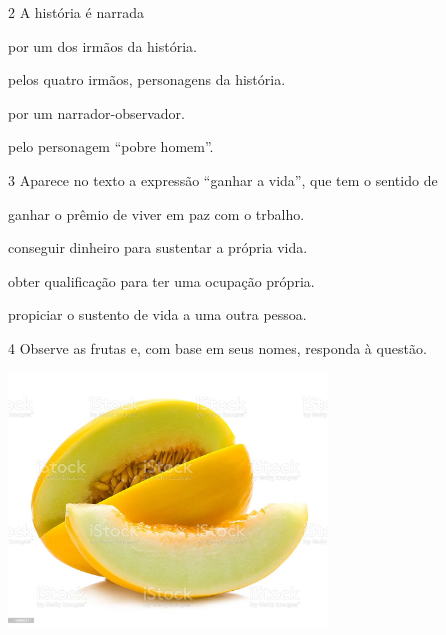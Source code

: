 \num{2} A história é narrada

\begin{escolha}
\item por um dos irmãos da história.

\item pelos quatro irmãos, personagens da história.

\item por um narrador-observador.

\item pelo personagem ``pobre homem''.
\end{escolha}



\num{3} Aparece no texto a expressão ``ganhar a vida'', que tem o sentido de

\begin{escolha}
\item ganhar o prêmio de viver em paz com o trbalho.

\item conseguir dinheiro para sustentar a própria vida.

\item obter qualificação para ter uma ocupação própria.

\item propiciar o sustento de vida a uma outra pessoa.
\end{escolha}


\num{4} Observe as frutas e, com base em seus nomes, responda à questão.



\includegraphics[width=3.33412in,height=2.64722in]{./media/image39.jpeg}

